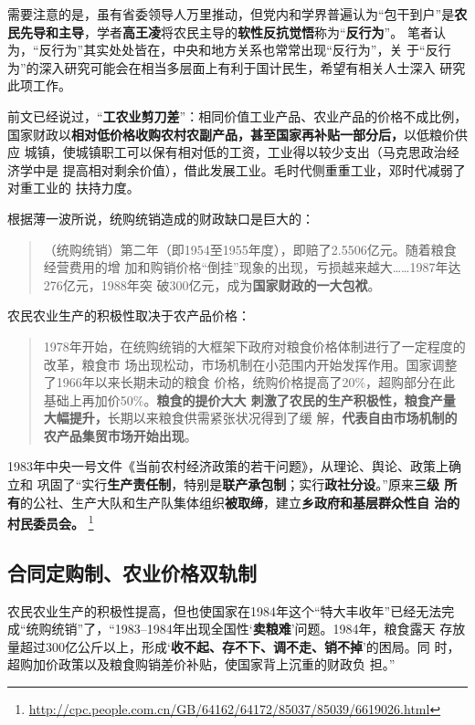 需要注意的是，虽有省委领导人万里推动，但党内和学界普遍认为“包干到户”是\textbf{农
  民先导和主导}，学者\textbf{高王凌}将农民主导的\textbf{软性反抗觉悟}称为“\textbf{反行为}”。
笔者认为，“反行为”其实处处皆在，中央和地方关系也常常出现“反行为”，关
于“反行为”的深入研究可能会在相当多层面上有利于国计民生，希望有相关人士深入
研究此项工作。

前文已经说过，“\textbf{工农业剪刀差}”：相同价值工业产品、农业产品的价格不成比例，
国家财政以\textbf{相对低价格收购农村农副产品，甚至国家再补贴一部分后，}以低粮价供应
城镇，使城镇职工可以保有相对低的工资，工业得以较少支出（马克思政治经济学中是
提高相对剩余价值），借此发展工业。毛时代侧重重工业，邓时代减弱了对重工业的
扶持力度。


根据薄一波所说，统购统销造成的财政缺口是巨大的：
\begin{quotation}
  （统购统销）第二年（即1954至1955年度），即赔了2.5506亿元。随着粮食经营费用的增
  加和购销价格“倒挂”现象的出现，亏损越来越大……1987年达276亿元，1988年突
  破300亿元，成为\textbf{国家财政的一大包袱}。
\end{quotation}

农民农业生产的积极性取决于农产品价格：
\begin{quotation}
  1978年开始，在统购统销的大框架下政府对粮食价格体制进行了一定程度的改革，粮食市
  场出现松动，市场机制在小范围内开始发挥作用。国家调整了1966年以来长期未动的粮食
  价格，统购价格提高了20\%，超购部分在此基础上再加价50\%。\textbf{粮食的提价大大
    刺激了农民的生产积极性，粮食产量大幅提升，}长期以来粮食供需紧张状况得到了缓
  解，\textbf{代表自由市场机制的农产品集贸市场开始出现}。\cite{taochangsheng}
\end{quotation}

1983年中央一号文件《当前农村经济政策的若干问题》，从理论、舆论、政策上确立和
巩固了“实行\textbf{生产责任制}，特别是\textbf{联产承包制}；实行\textbf{政社分设}。”原来\textbf{三级
  所有}的公社、生产大队和生产队集体组织\textbf{被取缔}，建立\textbf{乡政府和基层群众性自
  治的村民委员会。}
\footnote{\url{http://cpc.people.com.cn/GB/64162/64172/85037/85039/6619026.html}}

\subsection{合同定购制、农业价格双轨制}
\label{sec:nongshuanggui}

农民农业生产的积极性提高，但也使国家在1984年这个“特大丰收年”已经无法完
成“统购统销”了，“1983--1984年出现全国性‘\textbf{卖粮难}’问题。1984年，粮食露天
存放量超过300亿公斤以上，形成‘\textbf{收不起、存不下、调不走、销不掉}’的困局。同
时，超购加价政策以及粮食购销差价补贴，使国家背上沉重的财政负
担。”\cite{liangshi40}


